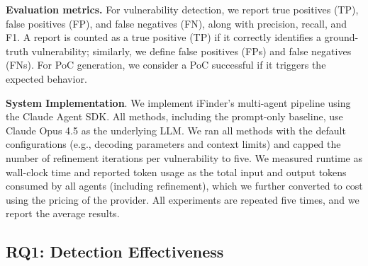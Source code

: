 \noindent\textbf{Evaluation metrics.}
For vulnerability detection, we report true positives (TP), false positives (FP), and false negatives (FN), along with precision, recall, and F1.
A report is counted as a true positive (TP) if it correctly identifies a ground-truth vulnerability; similarly, we define false positives (FPs) and false negatives (FNs).
For PoC generation, we consider a PoC successful if it triggers the expected behavior.

\noindent\textbf{System Implementation}.
We implement iFinder's multi-agent pipeline using the Claude Agent SDK. All methods, including the prompt-only baseline, use Claude Opus 4.5 as the underlying LLM. We ran all methods with the default configurations (e.g., decoding parameters and context limits) and capped the number of refinement iterations per vulnerability to five. We measured runtime as wall-clock time and reported token usage as the total input and output tokens consumed by all agents (including refinement), which we further converted to cost using the pricing of the provider.
All experiments are repeated five times, and we report the average results.




\subsection{RQ1: Detection Effectiveness}



